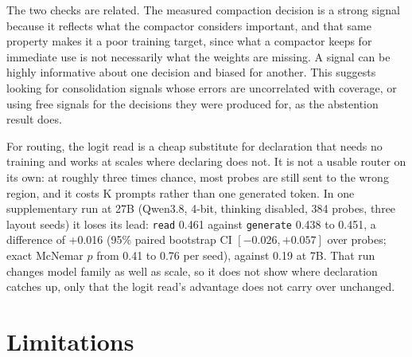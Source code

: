 \documentclass[10pt]{article}
\begin{document}
The two checks are related. The measured compaction decision is a strong signal because it
reflects what the compactor considers important, and that same property makes it a poor
training target, since what a compactor keeps for immediate use is not necessarily what the
weights are missing. A signal can be highly informative about one decision and biased for
another. This suggests looking for consolidation signals whose errors are uncorrelated with
coverage, or using free signals for the decisions they were produced for, as the abstention
result does.

For routing, the logit read is a cheap substitute for declaration that needs no training and
works at scales where declaring does not. It is not a usable router on its own: at roughly
three times chance, most probes are still sent to the wrong region, and it costs K prompts
rather than one generated token. In one supplementary run at 27B (Qwen3.8, 4-bit, thinking
disabled, 384 probes, three layout seeds) it loses its lead: \texttt{read} 0.461 against
\texttt{generate} 0.438 to 0.451, a difference of +0.016 (95\% paired bootstrap CI
$[-0.026, +0.057]$ over probes; exact McNemar $p$ from 0.41 to 0.76 per seed), against 0.19 at 7B. That run changes model family as well as scale,
so it does not show where declaration catches up, only that the logit read's advantage does not
carry over unchanged.

\section{Limitations}
\end{document}

